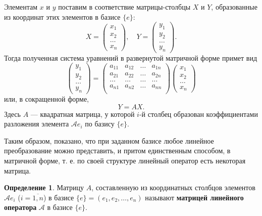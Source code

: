 \documentclass[a5paper, 11pt]{extbook}
\theoremstyle{definition}
\theoremstyle{definition}
\newtheorem{definition}{Определение}[section]
\theoremstyle{definition}
\begin{document}
Элементам \(x\) и \(y\) поставим в соответствие матрицы-столбцы \(X\) и \(Y\), образованные из координат этих элементов в базисе \(\{e\}\):
\[
    X =
    \begin{pmatrix}
        x_1    \\
        x_2    \\
        \ldots \\
        x_n
    \end{pmatrix},
    \quad
    Y =
    \begin{pmatrix}
        y_1    \\
        y_2    \\
        \ldots \\
        y_n
    \end{pmatrix}.
\]
Тогда полученная система уравнений в развернутой матричной форме примет вид
\[
    \begin{pmatrix}
        y_1    \\
        y_2    \\
        \ldots \\
        y_n
    \end{pmatrix}
    =
    \begin{pmatrix}
        a_{11} & a_{12} & \ldots & a_{1n} \\
        a_{21} & a_{22} & \ldots & a_{2n} \\
        \ldots & \ldots & \ldots & \ldots \\
        a_{n1} & a_{n2} & \ldots & a_{nn} \\
    \end{pmatrix}
    \begin{pmatrix}
        x_1    \\
        x_2    \\
        \ldots \\
        x_n
    \end{pmatrix}
\]
или, в сокращенной форме,
\[
    Y = AX.
\]
Здесь \(A\) — квадратная матрица, у которой \(i\)-й столбец образован коэффициентами разложения элемента \(\mathcal{A} e_i\) по базису \(\{e\}\).

Таким образом, показано, что при заданном базисе любое линейное преобразование можно представить, и притом единственным способом, в матричной форме, т. е. по своей структуре линейный оператор есть некоторая матрица.

\begin{definition}
    Матрицу \(A\), составленную из координатных столбцов элементов \(\mathcal{A} e_i\) (\(i = \overline{1, n}\)) в базисе \(\{e\} = (e_1, e_2, \ldots, e_n)\) называют \textbf{матрицей линейного оператора} \(\mathcal{A}\) в базисе \(\{e\}\).
\end{definition}
\end{document}
